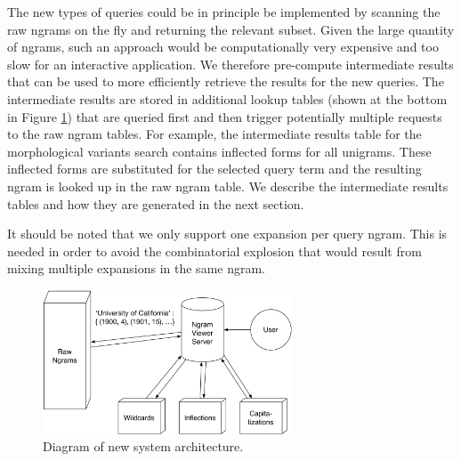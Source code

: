 \documentclass[11pt]{article}
\begin{document}
The new types of queries could be in principle be implemented by scanning the raw ngrams on the fly and returning the relevant subset. Given the large quantity of ngrams, such an approach would be computationally very expensive and too slow for an interactive application. We therefore pre-compute intermediate results that can be used to more efficiently retrieve the results for the new queries. The intermediate results are stored in additional lookup tables (shown at the bottom in Figure \ref{fig:architecture}) that are queried first and then trigger potentially multiple requests to the raw ngram tables. For example, the intermediate results table for the morphological variants search contains inflected forms for all unigrams. These inflected forms are substituted for the selected query term and the resulting ngram is looked up in the raw ngram table. We describe the intermediate results tables and how they are generated in the next section.

It should be noted that we only support one expansion per query ngram. This is needed in order to avoid the combinatorial explosion that would result from mixing multiple expansions in the same ngram.



\begin{figure}
\includegraphics[width=20em,keepaspectratio=true]{system_architecture}
\caption{\label{fig:architecture}Diagram of new system architecture.}
\end{figure}
\end{document}
